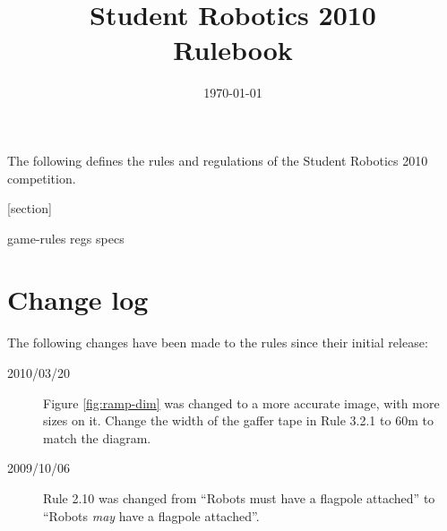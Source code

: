 \documentclass[a4paper, 12pt]{article}
\title {Student Robotics 2010\\ Rulebook}
\date{\today}
\begin{document}
\maketitle

\noindent The following defines the rules and regulations of the Student Robotics 2010 competition.

[section]
\newcommand{\rcn}{\stepcounter{rule}\arabic{section}.\arabic{rule}}
\renewcommand{\labelenumi}{\rcn}

 {game-rules}
\newpage
 {regs}
\newpage
 {specs}

\section{Change log}
The following changes have been made to the rules since their initial release:
\begin{description}
\item [2010/03/20] Figure \ref{fig:ramp-dim} was changed to a more accurate image, with more sizes on it.
 Change the width of the gaffer tape in Rule 3.2.1 to 60m to match the diagram.
\item [2009/10/06] Rule 2.10 was changed from ``Robots must have a flagpole attached'' to ``Robots \emph{may} have a flagpole attached''.
\end{description}
\end{document}
